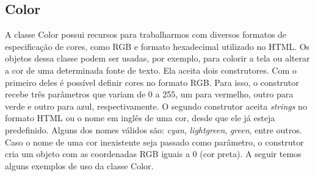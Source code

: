 \subsection{Color}
%
%
A classe Color possui recursos para trabalharmos com diversos formatos de especificação de cores, como RGB e formato hexadecimal utilizado no HTML. Os objetos dessa classe podem ser usadas, por exemplo, para colorir a tela ou alterar a cor de uma determinada fonte de texto. Ela aceita dois construtores. Com o primeiro deles é possível definir cores no formato RGB. Para isso, o construtor recebe três parâmetros que variam de 0 a 255, um para vermelho, outro para verde e outro para azul, respectivamente. O segundo construtor aceita \textit{strings} no formato HTML ou o nome em inglês de uma cor, desde que ele já esteja predefinido. Alguns dos nomes válidos são: \textit{cyan}, \textit{lightgreen}, \textit{green}, entre outros. Caso o nome de uma cor inexistente seja passado como parâmetro, o construtor cria um objeto com as coordenadas RGB iguais a 0 (cor preta). A seguir temos alguns exemplos de uso da classe Color.
%
%

%
%
